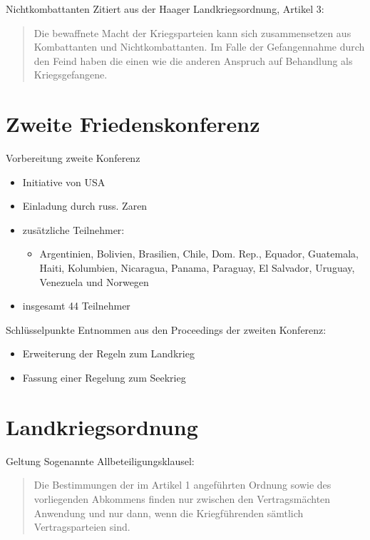 \documentclass{beamer}
\begin{document}
\begin{frame}{Nichtkombattanten}
    Zitiert aus der Haager Landkriegsordnung, Artikel 3\cite{DeutschesReich2010}:
    \begin{quotation}
        Die bewaffnete Macht der Kriegsparteien kann sich zusammensetzen aus Kombattanten und Nichtkombattanten. Im Falle der Gefangennahme durch den Feind haben die einen wie die anderen Anspruch auf Behandlung als Kriegsgefangene.
    \end{quotation}
\end{frame}

\section{Zweite Friedenskonferenz}
\begin{frame}{Vorbereitung zweite Konferenz}
    \begin{itemize}
        \item Initiative von USA
        \item Einladung durch russ. Zaren
        \item zusätzliche Teilnehmer:
          \begin{itemize}
              \item Argentinien, Bolivien, Brasilien, Chile, Dom. Rep., Equador, Guatemala, Haiti, Kolumbien, Nicaragua, Panama, Paraguay, El Salvador, Uruguay, Venezuela und Norwegen
          \end{itemize}
        \item insgesamt 44 Teilnehmer
    \end{itemize}
\end{frame}

\begin{frame}{Schlüsselpunkte}
    Entnommen aus den Proceedings der zweiten Konferenz\cite{Scott-V1-1921}:
    \begin{itemize}
        \item Erweiterung der Regeln zum Landkrieg
        \item Fassung einer Regelung zum Seekrieg
    \end{itemize}
\end{frame}

\section{Landkriegsordnung}
\begin{frame}{Geltung}
    Sogenannte Allbeteiligungsklausel:
    \begin{quotation}
      Die Bestimmungen der im Artikel 1 angeführten Ordnung sowie des vorliegenden Abkommens finden nur zwischen den Vertragsmächten Anwendung und nur dann, wenn die Kriegführenden sämtlich Vertragsparteien sind.
    \end{quotation}
\end{frame}
\end{document}

